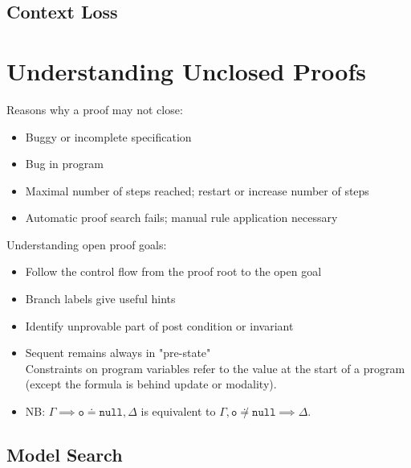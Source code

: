 		\subsection{Context Loss} %

	\section{Understanding Unclosed Proofs}
		Reasons why a proof may not close:
		\begin{itemize}
			\item Buggy or incomplete specification
			\item Bug in program
			\item Maximal number of steps reached; restart or increase number of steps
			\item Automatic proof search fails; manual rule application necessary
		\end{itemize}
	
		Understanding open proof goals:
		\begin{itemize}
			\item Follow the control flow from the proof root to the open goal
			\item Branch labels give useful hints
			\item Identify unprovable part of post condition or invariant
			\item Sequent remains always in "pre-state" \\ Constraints on program variables refer to the value at the start of a program (except the formula is behind update or modality).
			\item NB: \( \Gamma \implies \texttt{o} \doteq \texttt{null}, \Delta \) is equivalent to \( \Gamma, \texttt{o} \not\doteq \texttt{null} \implies \Delta \).
		\end{itemize}

		\subsection{Model Search} %
